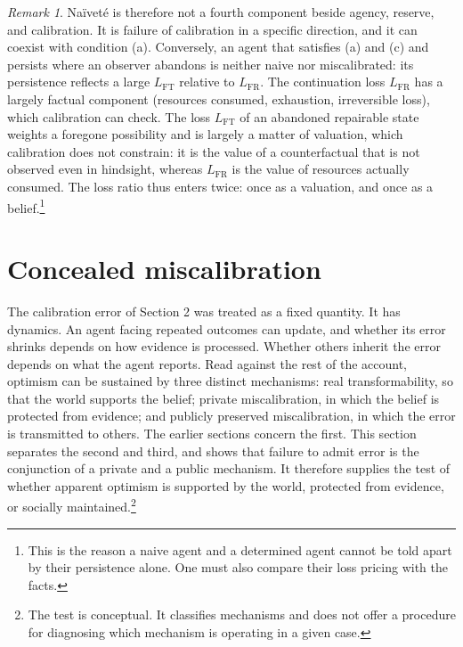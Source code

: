 \documentclass[11pt]{article}
\theoremstyle{remark}
\newtheorem{remark}{Remark}
\begin{document}
\begin{remark}
Na\"ivet\'e is therefore not a fourth component beside agency, reserve, and calibration. It is failure of calibration in a specific direction, and it can coexist with condition (a). Conversely, an agent that satisfies (a) and (c) and persists where an observer abandons is neither naive nor miscalibrated: its persistence reflects a large $L_{\mathrm{FT}}$ relative to $L_{\mathrm{FR}}$. The continuation loss $L_{\mathrm{FR}}$ has a largely factual component (resources consumed, exhaustion, irreversible loss), which calibration can check. The loss $L_{\mathrm{FT}}$ of an abandoned repairable state weights a foregone possibility and is largely a matter of valuation, which calibration does not constrain: it is the value of a counterfactual that is not observed even in hindsight, whereas $L_{\mathrm{FR}}$ is the value of resources actually consumed. The loss ratio thus enters twice: once as a valuation, and once as a belief.\footnote{This is the reason a naive agent and a determined agent cannot be told apart by their persistence alone. One must also compare their loss pricing with the facts.}
\end{remark}

\section{Concealed miscalibration}

The calibration error of Section 2 was treated as a fixed quantity. It has dynamics. An agent facing repeated outcomes can update, and whether its error shrinks depends on how evidence is processed. Whether others inherit the error depends on what the agent reports. Read against the rest of the account, optimism can be sustained by three distinct mechanisms: real transformability, so that the world supports the belief; private miscalibration, in which the belief is protected from evidence; and publicly preserved miscalibration, in which the error is transmitted to others. The earlier sections concern the first. This section separates the second and third, and shows that failure to admit error is the conjunction of a private and a public mechanism. It therefore supplies the test of whether apparent optimism is supported by the world, protected from evidence, or socially maintained.\footnote{The test is conceptual. It classifies mechanisms and does not offer a procedure for diagnosing which mechanism is operating in a given case.}
\end{document}
